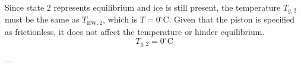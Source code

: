 Since state 2 represents equilibrium and ice is still present, the temperature \( T_{g,2} \) must be the same as \( T_{\text{EW},2} \), which is \( T = 0^\circ\text{C} \).  
Given that the piston is specified as frictionless, it does not affect the temperature or hinder equilibrium.  
\[
T_{g,2} = 0^\circ\text{C}
\]

---